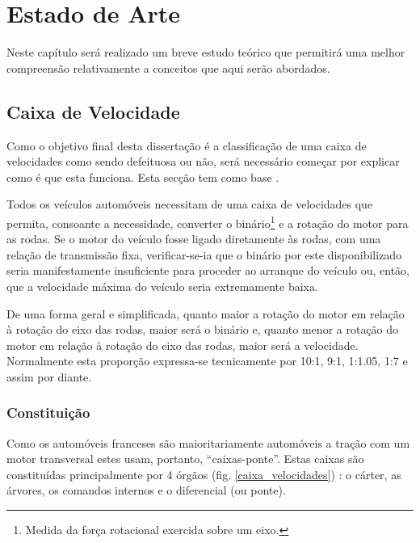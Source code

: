
\chapter{Estado de Arte}
\label{chapter:Estado de Arte}

\begin{Estado de Arte}

Neste capítulo será realizado um breve estudo teórico que permitirá uma melhor compreensão relativamente a conceitos que aqui serão abordados.

\end{Estado de Arte}

\section{Caixa de Velocidade}
Como o objetivo final desta dissertação é a classificação de uma caixa de velocidades como sendo defeituosa ou não, será necessário começar por explicar como é que esta funciona. Esta secção tem como base \textcite{formacaoCaixa}.

Todos os veículos automóveis necessitam de uma caixa de velocidades que permita, consoante a necessidade, converter o binário\footnote{Medida da força rotacional exercida sobre um eixo.} e a rotação do motor para as rodas.
Se o motor do veículo fosse ligado diretamente às rodas, com uma relação de transmissão fixa, verificar-se-ia que o binário por este disponibilizado seria manifestamente insuficiente para proceder ao arranque do veículo ou, então, que a velocidade máxima do veículo seria extremamente baixa.

De uma forma geral e simplificada, quanto maior a rotação do motor em relação à rotação do eixo das rodas, maior será o binário e, quanto menor a rotação do motor em relação à rotação do eixo das rodas, maior será a velocidade. Normalmente esta proporção expressa-se tecnicamente por 10:1, 9:1, 1:1.05, 1:7 e assim por diante.

\subsection{Constituição}

Como os automóveis franceses são maioritariamente automóveis a tração com um motor transversal estes usam, portanto, ``caixas-ponte''.
Estas caixas são constituídas principalmente por 4 órgãos (fig. \ref{caixa_velocidades}) : o cárter, as árvores, os comandos internos e o diferencial (ou ponte).

